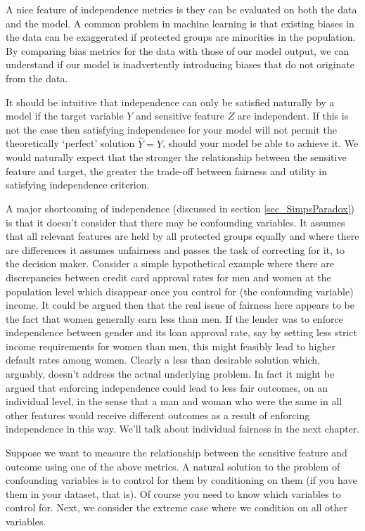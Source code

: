 A nice feature of independence metrics is they can be evaluated on both the data and the model. A common problem in machine learning is that existing biases in the data can be exaggerated if protected groups are minorities in the population. By comparing bias metrics for the data with those of our model output, we can understand if our model is inadvertently introducing biases that do not originate from the data.

It should be intuitive that independence can only be satisfied naturally by a model if the target variable $Y$ and sensitive feature $Z$ are independent. If this is not the case then satisfying independence for your model will not permit the theoretically `perfect' solution $\hat{Y}=Y$, should your model be able to achieve it. We would naturally expect that the stronger the relationship between the sensitive feature and target, the greater the trade-off between fairness and utility in satisfying independence criterion.

A major shortcoming of independence (discussed in section \ref{sec_SimpsParadox}) is that it doesn't consider that there may be confounding variables. It assumes that all relevant features are held by all protected groups equally and where there are differences it assumes unfairness and passes the task of correcting for it, to the decision maker. Consider a simple hypothetical example where there are discrepancies between credit card approval rates for men and women at the population level which disappear once you control for (the confounding variable) income. It could be argued then that the real issue of fairness here appears to be the fact that women generally earn less than men. If the lender was to enforce independence between gender and its loan approval rate, say by setting less strict income requirements for women than men, this might feasibly lead to higher default rates among women. Clearly a less than desirable solution which, arguably, doesn't address the actual underlying problem. In fact it might be argued that enforcing independence could lead to less fair outcomes, on an individual level, in the sense that a man and woman who were the same in all other features would receive different outcomes as a result of enforcing independence in this way. We'll talk about individual fairness in the next chapter.

Suppose we want to measure the relationship between the sensitive feature and outcome using one of the above metrics. A natural solution to the problem of confounding variables is to control for them by conditioning on them (if you have them in your dataset, that is). Of course you need to know which variables to control for. Next, we consider the extreme case where we condition on all other variables.

